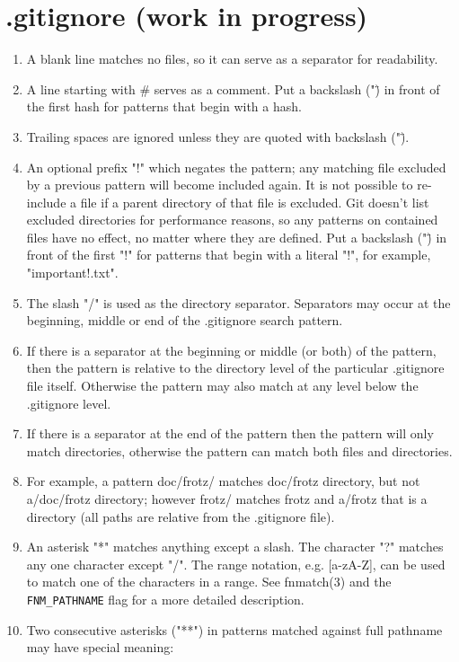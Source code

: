\documentclass{charuun}
\begin{document}
\section{.gitignore (work in progress)}
\begin{enumerate}
\item A blank line matches no files, so it can serve as a separator for readability.
\item A line starting with \# serves as a comment. Put a backslash ("\") in front of the first hash for patterns that begin with a hash.
\item Trailing spaces are ignored unless they are quoted with backslash ("\").
\item An optional prefix "!" which negates the pattern; any matching file excluded by a previous pattern will become included again. It is not possible to re-include a file if a parent directory of that file is excluded. Git doesn’t list excluded directories for performance reasons, so any patterns on contained files have no effect, no matter where they are defined. Put a backslash ("\") in front of the first "!" for patterns that begin with a literal "!", for example, "\!important!.txt".
\item The slash "/" is used as the directory separator. Separators may occur at the beginning, middle or end of the .gitignore search pattern.
\item If there is a separator at the beginning or middle (or both) of the pattern, then the pattern is relative to the directory level of the particular .gitignore file itself. Otherwise the pattern may also match at any level below the .gitignore level.
\item If there is a separator at the end of the pattern then the pattern will only match directories, otherwise the pattern can match both files and directories.
\item For example, a pattern doc/frotz/ matches doc/frotz directory, but not a/doc/frotz directory; however frotz/ matches frotz and a/frotz that is a directory (all paths are relative from the .gitignore file).
\item An asterisk "*" matches anything except a slash. The character "?" matches any one character except "/". The range notation, e.g. [a-zA-Z], can be used to match one of the characters in a range. See fnmatch(3) and the \texttt{FNM_PATHNAME} flag for a more detailed description.
\item Two consecutive asterisks ("**") in patterns matched against full pathname may have special meaning:

\end{enumerate}
\end{document}
